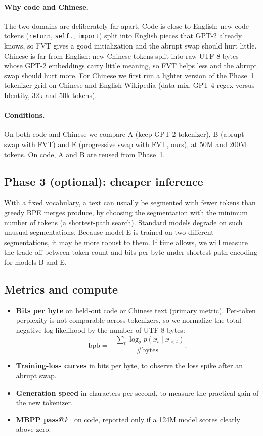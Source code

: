\documentclass[11pt,a4paper]{article}
\begin{document}
\paragraph{Why code and Chinese.} The two domains are deliberately far apart. Code is close to English: new code tokens (\texttt{return}, \texttt{self.}, \texttt{import}) split into English pieces that GPT-2 already knows, so FVT gives a good initialization and the abrupt swap should hurt little. Chinese is far from English: new Chinese tokens split into raw UTF-8 bytes whose GPT-2 embeddings carry little meaning, so FVT helps less and the abrupt swap should hurt more. For Chinese we first run a lighter version of the Phase~1 tokenizer grid on Chinese and English Wikipedia (data mix, GPT-4 regex versus Identity, 32k and 50k tokens).

\paragraph{Conditions.} On both code and Chinese we compare A (keep GPT-2 tokenizer), B (abrupt swap with FVT) and E (progressive swap with FVT, ours), at 50M and 200M tokens. On code, A and B are reused from Phase~1.

\subsection{Phase 3 (optional): cheaper inference}
With a fixed vocabulary, a text can usually be segmented with fewer tokens than greedy BPE merges produce, by choosing the segmentation with the minimum number of tokens (a shortest-path search). Standard models degrade on such unusual segmentations. Because model E is trained on two different segmentations, it may be more robust to them. If time allows, we will measure the trade-off between token count and bits per byte under shortest-path encoding for models B and E.

\subsection{Metrics and compute}
\begin{itemize}
  \item \textbf{Bits per byte} on held-out code or Chinese text (primary metric). Per-token perplexity is not comparable across tokenizers, so we normalize the total negative log-likelihood by the number of UTF-8 bytes:
  \begin{equation}
    \mathrm{bpb} = \frac{-\sum_t \log_2 p(x_t \mid x_{<t})}{\#\text{bytes}}.
  \end{equation}
  \item \textbf{Training-loss curves} in bits per byte, to observe the loss spike after an abrupt swap.
  \item \textbf{Generation speed} in characters per second, to measure the practical gain of the new tokenizer.
  \item \textbf{MBPP pass@$k$}~\citep{austin2021mbpp} on code, reported only if a 124M model scores clearly above zero.
\end{itemize}
\end{document}
